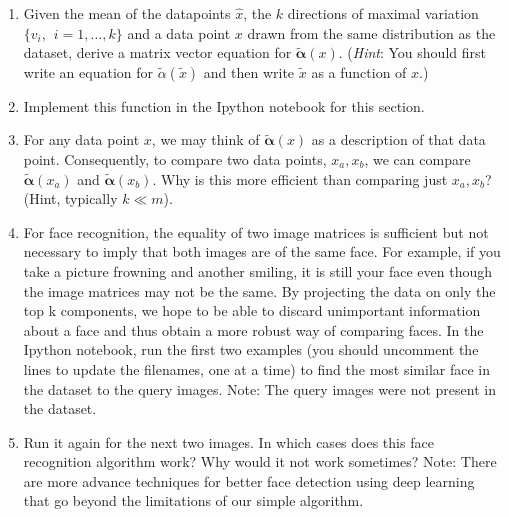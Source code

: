\begin{enumerate}
     \item
    Given the mean of the datapoints $\hat{x}$, the $k$ directions of maximal variation $\{v_i, \hspace{5pt} i=1,\hdots, k\}$ and a data point $x$ drawn from the same distribution as the dataset, derive a matrix vector equation for $\tilde{\mathbf{\alpha}}(x)$. (\emph{Hint}: You should first write an equation for $\tilde{\alpha}(\tilde{x})$ and then write $\tilde{x}$ as a function of $x$.)
    \newline
    
    \sol{}
    
    \item
    Implement this function in the Ipython notebook for this section. 
    \newline
    
    \sol{}
    
    \item
    For any data point $x$, we may think of $\tilde{\mathbf{\alpha}}(x)$ as a description of that data point. Consequently, to compare two data points, $x_a, x_b$, we can compare $\tilde{\mathbf{\alpha}}(x_a)$ and $\tilde{\mathbf{\alpha}}(x_b)$.
    Why is this more efficient than comparing just $x_a, x_b$? (Hint, typically $k \ll m$).
    \newline
    
    \sol{}
    
    \item
    For face recognition, the equality of two image matrices is sufficient but not necessary to imply that both images are of the same face. For example, if you take a picture frowning and another smiling, it is still your face even though the image matrices may not be the same. By projecting the data on only the top k components, we hope to be able to discard unimportant information about a face and thus obtain a more robust way of comparing faces. In the Ipython notebook, run the first two examples (you should uncomment the lines to update the filenames, one at a time) to find the most similar face in the dataset to the query images. Note: The query images were not present in the dataset. 
    \newline
    
    \sol{}
    
    \item
    Run it again for the next two images. In which cases does this face recognition algorithm work? Why would it not work sometimes? Note: There are more advance techniques for better face detection using deep learning that go beyond the limitations of our simple algorithm.
    
    \sol{}
\end{enumerate}